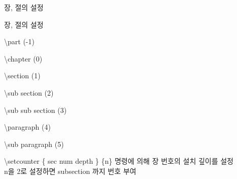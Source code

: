 \documentclass[ aspectratio=149,  14pt,blue,xcolor=pdftex,dvipsnames,table,handout,notes]{beamer}
\begin{document}
		\begin{frame}[t]{장, 절의 설정}

			\begin{block} {장, 절의 설정}
			\begin{description}[1234567890]
			\item[부]		\textbackslash part (-1)
			\item[장]		\textbackslash chapter (0)
			\item[절]		\textbackslash section	(1)
			\item[소절]	\textbackslash sub section	(2)
			\item[소소절]	\textbackslash sub sub section (3)
			\item[문단]	\textbackslash paragraph (4)
			\item[소문단]	\textbackslash sub paragraph (5)
			\end{description}
			\end{block}

		\textbackslash setcounter \{ sec num depth \} \{n\} 명령에 의해 장 번호의 설치 깊이를 설정\\
		n을 2로 설정하면 subsection 까지 번호 부여
		\end{frame}
\end{document}
